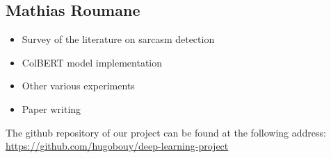 \documentclass[10pt,twocolumn,letterpaper]{article}
\begin{document}
\subsection{Mathias Roumane}
\begin{itemize}
    \item Survey of the literature on sarcasm detection
    \item ColBERT model implementation
    \item Other various experiments
    \item Paper writing
\end{itemize}

The github repository of our project can be found at the following address: \url{https://github.com/hugobouy/deep-learning-project}



\nocite{*}
{\small


}
\end{document}
